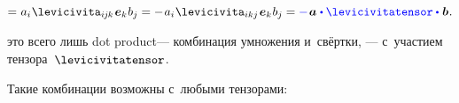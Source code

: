 \begin{otherlanguage}{russian}
\begin{multline}
\\[-0.12em]
= \hspace{.1ex} a_i \hspace{.1ex} \levicivita_{i\hspace{-0.1ex}j\hspace{-0.1ex}k} \hspace{.2ex} \bm{e}_k \hspace{.1ex} b_j
= - \hspace{.2ex} a_i \hspace{.1ex} \levicivita_{ikj} \hspace{.2ex} \bm{e}_k \hspace{.1ex} b_j
= \mathcolor{blue}{-} \hspace{.2ex} \bm{a} \hspace{.1ex} \mathcolor{blue}{\dotp \levicivitatensor \dotp} \hspace{.12ex} \bm{b}
\hspace{.1ex} .
\end{multline}

\vspace{-0.12em}\noindent
{} это всего лишь dot product\:--- комбинация умножения и~свёртки, \:--- с~участием тензора~$\levicivitatensor$.

Такие комбинации возможны с~любыми тензорами:


\end{otherlanguage}
